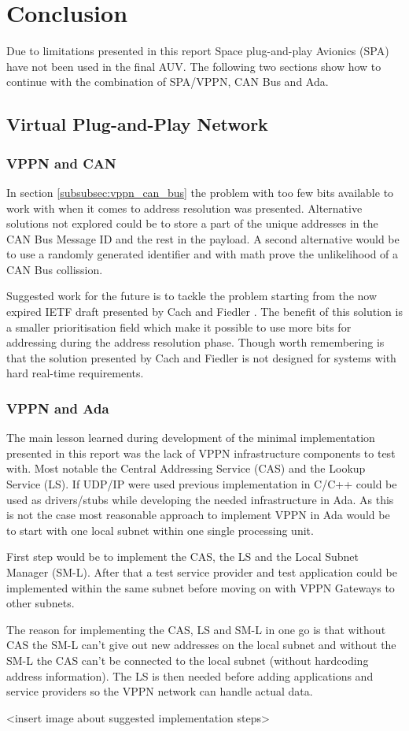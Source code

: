 \section{Conclusion}\label{sec:conclusion}
Due to limitations presented in this report Space plug-and-play Avionics (SPA) have
not been used in the final AUV. The following two sections show how to continue
with the combination of SPA/VPPN, CAN Bus and Ada.

\subsection{Virtual Plug-and-Play Network}
\subsubsection{VPPN and CAN}
In section \ref{subsubsec:vppn_can_bus} the problem with too few bits
available to work with when it comes to address resolution was presented.
Alternative solutions not explored could be to store a part of the unique
addresses in the CAN Bus Message ID and the rest in the payload. A second
alternative would be to use a randomly generated identifier and with math
prove the unlikelihood of a CAN Bus collission.

Suggested work for the future is to tackle the problem starting from the now
expired IETF draft presented by Cach and Fiedler \cite{web:draft-ip_over_can}.
The benefit of this solution is a
smaller prioritisation field which make it possible to use more bits for
addressing during the address resolution phase. Though worth remembering is
that the solution presented by Cach and Fiedler is not designed for systems
with hard real-time requirements.

\subsubsection{VPPN and Ada}
The main lesson learned during development of the minimal implementation
presented in this report was the lack of VPPN infrastructure
components to test with. Most notable the Central Addressing Service (CAS) and the
Lookup Service (LS). If UDP/IP were used previous implementation in C/C++ could be
used as drivers/stubs while developing the needed infrastructure in Ada. As
this is not the case most reasonable approach to implement VPPN in Ada would
be to start with one local subnet within one single processing unit.

First step would be to implement the CAS, the LS and the Local Subnet Manager (SM-L).
After that a test service provider and test application could be implemented
within the same subnet before moving on with VPPN Gateways to other subnets.

The reason for implementing the CAS, LS and SM-L in one go is
that without CAS the SM-L can't give out new addresses on the local subnet and
without the SM-L the CAS can't be connected to the local subnet (without
hardcoding address information). The LS is then needed before adding
applications and service providers so the VPPN network can handle actual data.

<insert image about suggested implementation steps>
